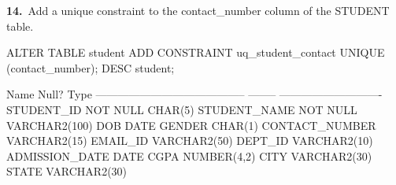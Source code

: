 
\noindent\begin{minipage}{\linewidth}
\begingroup{}
{\fontsize{14}{17}\selectfont\textbf{14.}}\ Add a unique constraint to the contact\_number column of the STUDENT table.\par
\endgroup\vspace{12pt}


\begin{sqlcode}
ALTER TABLE student
    ADD CONSTRAINT uq_student_contact UNIQUE (contact_number);
DESC student;
\end{sqlcode}

\vspace{18pt}


\begin{sqlout}
 Name                                      Null?    Type
 ----------------------------------------- -------- ----------------------------
 STUDENT_ID                                NOT NULL CHAR(5)
 STUDENT_NAME                              NOT NULL VARCHAR2(100)
 DOB                                                DATE
 GENDER                                             CHAR(1)
 CONTACT_NUMBER                                     VARCHAR2(15)
 EMAIL_ID                                           VARCHAR2(50)
 DEPT_ID                                            VARCHAR2(10)
 ADMISSION_DATE                                     DATE
 CGPA                                               NUMBER(4,2)
 CITY                                               VARCHAR2(30)
 STATE                                              VARCHAR2(30)
\end{sqlout}
\end{minipage}\par\vspace{30pt}

